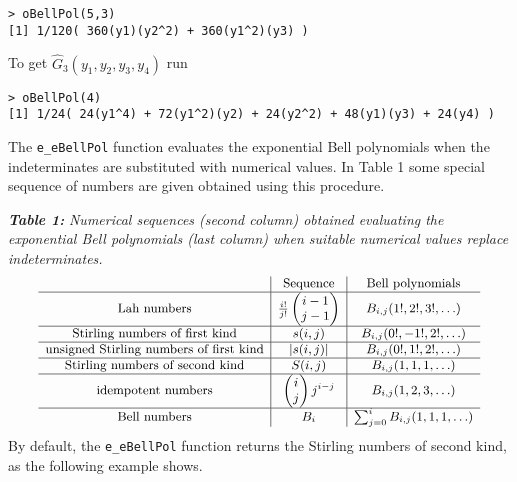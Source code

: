 \begin{verbatim}
> oBellPol(5,3)
[1] 1/120( 360(y1)(y2^2) + 360(y1^2)(y3) )
\end{verbatim}

\noindent To get \(\hat{G}_3(y_1, y_2, y_3, y_4)\) run

\begin{verbatim}
> oBellPol(4)
[1] 1/24( 24(y1^4) + 72(y1^2)(y2) + 24(y2^2) + 48(y1)(y3) + 24(y4) )
\end{verbatim}

The \texttt{e\_eBellPol} function evaluates the exponential Bell
polynomials when the indeterminates are substituted with numerical
values. In Table 1 some special sequence of numbers are given obtained
using this procedure.

\textbf{\emph{Table 1:}} \emph{Numerical sequences (second column)
obtained evaluating the exponential Bell polynomials (last column) when
suitable numerical values replace indeterminates.}
\[{\small \begin{array}{c|c|c} 
                           \hbox{ }              & \hbox{Sequence}                 &  \hbox{Bell polynomials} \\  \hline 
\hbox{Lah numbers}                             & \frac{i!}{j!} \begin{pmatrix}
i-1 \\j-1
\end{pmatrix} & B_{i,j} (1!, 2!, 3!, \ldots) \\ \hline 
\hbox{Stirling numbers of first kind}          & s(i,j)                          & B_{i,j} (0!, -1!, 2!, \ldots) \\ \hline  
\hbox{unsigned Stirling numbers of first kind} & |s(i,j)|                        & B_{i,j} (0!, 1!, 2!, \ldots) \\ \hline 
\hbox{Stirling numbers of second kind}         & S(i,j)                          & B_{i,j} (1, 1, 1, \ldots) \\ \hline 
\hbox{idempotent numbers}                      & \begin{pmatrix}
i \\j
\end{pmatrix} j^{i-j}           & B_{i,j} (1, 2, 3, \ldots) \\ \hline 
\hbox{Bell numbers}                            & B_i                             & \sum_{j=0}^i B_{i,j} (1, 1, 1, \ldots)
\end{array}}\] By default, the \texttt{e\_eBellPol} function returns the
Stirling numbers of second kind, as the following example shows.

